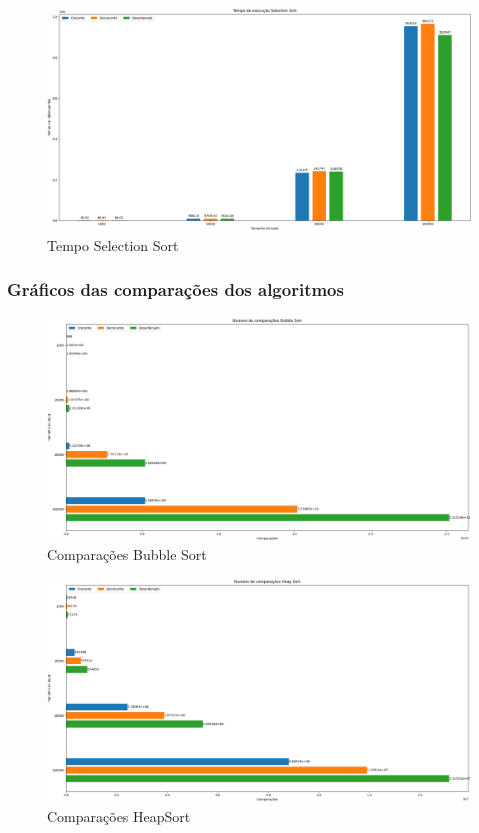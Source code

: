 \documentclass[12pt,a4paper]{article}
\begin{document}
\begin{figure}[H]
    \centering
    \includegraphics[width=\textwidth]{Graficos/Tempos/SelectionSort.png}
    \caption{Tempo Selection Sort}
    \label{fig:tempSelectionSort}
\end{figure}

\subsubsection{Gráficos das comparações dos algoritmos}
\begin{figure}[H]
    \centering
    \includegraphics[width=\textwidth]{Graficos/Comparações/Bubble Sort.png}
    \caption{Comparações Bubble Sort}
    \label{fig:compBubbleSort}
\end{figure}

\begin{figure}[H]
    \centering
    \includegraphics[width=\textwidth]{Graficos/Comparações/Heap Sort.png}
    \caption{Comparações HeapSort}
    \label{fig:compHeapSort}
\end{figure}
\end{document}
